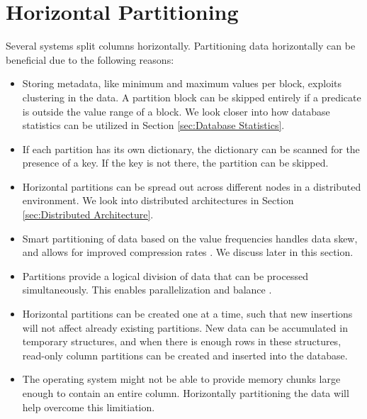 \section{Horizontal Partitioning}
\label{sec:Horizontal Partitioning}
Several systems split columns horizontally. Partitioning data horizontally can be beneficial due to the following reasons:
\begin{itemize}
  \item Storing metadata, like minimum and maximum values per block, exploits clustering in the data. A partition block can be skipped entirely if a predicate is outside the value range of a block. We look closer into how database statistics can be utilized in Section \ref{sec:Database Statistics}. 
  \item If each partition has its own dictionary, the dictionary can be scanned for the presence of a key. If the key is not there, the partition can be skipped.
  \item Horizontal partitions can be spread out across different nodes in a distributed environment. We look into distributed architectures in Section \ref{sec:Distributed Architecture}.
  \item Smart partitioning of data based on the value frequencies handles data skew, and allows for improved compression rates \cite{Raman2008-gi}. We discuss  later in this section.
  \item Partitions provide a logical division of data that can be processed simultaneously. This enables parallelization and balance \cite{Exasol2014-xh}.
  \item Horizontal partitions can be created one at a time, such that new insertions will not affect already existing partitions. New data can be accumulated in temporary structures, and when there is enough rows in these structures, read-only column partitions can be created and inserted into the database.
  \item The operating system might not be able to provide memory chunks large enough to contain an entire column. Horizontally partitioning the data will help overcome this limitiation.
\end{itemize}




